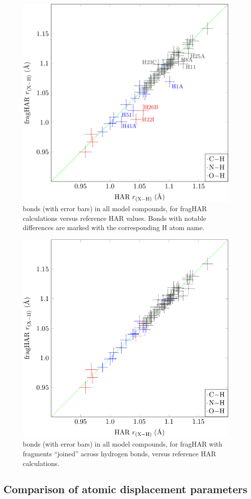 \documentclass[preprint,dvipsnames]{iucr}              %
\begin{document}
\begin{figure}
\centering
\includegraphics[width=0.6\linewidth]{graph_bond_H.png}
 
\caption{ bonds (with error bars) in all model compounds,
        for fragHAR calculations versus reference HAR values. 
        Bonds with notable differences are marked with the 
        corresponding H atom name.}
		\label{fig_bond_len_H_bond_type}
\end{figure}


\begin{figure}
 \centering
 \includegraphics[width=0.6\linewidth]{bond_H_cor.png}
		\caption{ bonds (with error bars) in all model compounds,
		for fragHAR with fragments ``joined'' across hydrogen bonds,
		versus reference HAR calculations.}
		\label{fig_bond_len_H_join_frag}
\end{figure}


\subsection{Comparison of  atomic displacement parameters}
\end{document}
